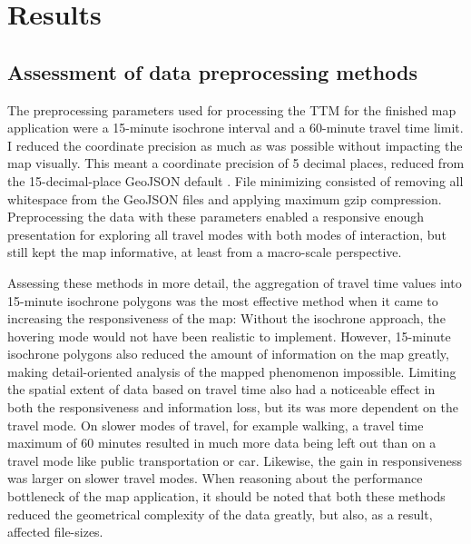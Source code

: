 \section{Results}

\subsection{Assessment of data preprocessing methods}

The preprocessing parameters used for
processing the TTM for the finished map application were
a 15-minute isochrone interval and a 60-minute travel time limit.
I reduced the coordinate precision as much as
was possible without impacting the map visually.
This meant a coordinate precision of 5 decimal places,
reduced from the 15-decimal-place GeoJSON default \parencite{geojsonspec}.
File minimizing consisted of removing all whitespace from the GeoJSON files
and applying maximum gzip compression.
Preprocessing the data with these parameters
enabled a responsive enough presentation for exploring all travel modes
with both modes of interaction,
but still kept the map informative, at least from a macro-scale perspective.

Assessing these methods in more detail,
the aggregation of travel time values into 15-minute isochrone polygons was the most
effective method when it came to increasing the responsiveness of the map:
Without the isochrone approach,
the hovering mode would not have been realistic to implement.
However, 15-minute isochrone polygons also
reduced the amount of information on the map greatly,
making detail-oriented analysis of the mapped phenomenon impossible.
Limiting the spatial extent of data based on travel time also had a noticeable effect
in both the responsiveness and information loss,
but its was more dependent on the travel mode.
On slower modes of travel, for example walking,
a travel time maximum of 60 minutes resulted in
much more data being left out than on a travel mode like public transportation or car.
Likewise, the gain in responsiveness was larger on slower travel modes.
When reasoning about the performance bottleneck of the map application,
it should be noted that both these methods
reduced the geometrical complexity of the data greatly,
but also, as a result, affected file-sizes.

